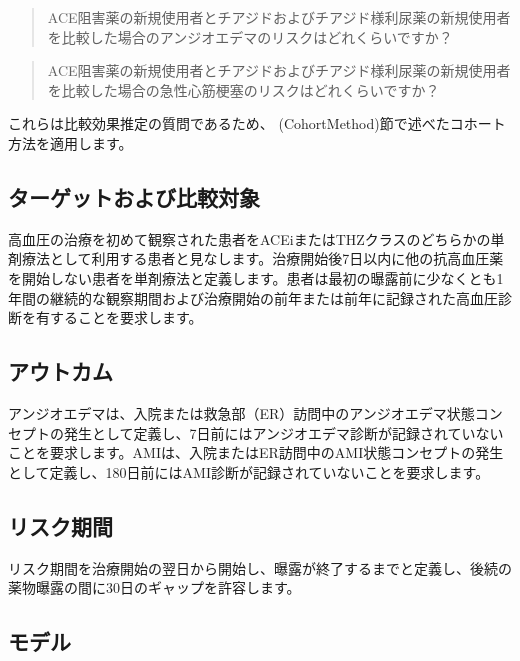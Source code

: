 \documentclass[
  11pt]{book}
\theoremstyle{definition}
\theoremstyle{definition}
\theoremstyle{definition}
\theoremstyle{definition}
\theoremstyle{remark}
\begin{document}
\begin{quote}
ACE阻害薬の新規使用者とチアジドおよびチアジド様利尿薬の新規使用者を比較した場合のアンジオエデマのリスクはどれくらいですか？
\end{quote}

\begin{quote}
ACE阻害薬の新規使用者とチアジドおよびチアジド様利尿薬の新規使用者を比較した場合の急性心筋梗塞のリスクはどれくらいですか？
\end{quote}

これらは比較効果推定の質問であるため、\citet{ref} (CohortMethod)節で述べたコホート方法を適用します。

\subsection{ターゲットおよび比較対象}\label{ux30bfux30fcux30b2ux30c3ux30c8ux304aux3088ux3073ux6bd4ux8f03ux5bfeux8c61}

高血圧の治療を初めて観察された患者をACEiまたはTHZクラスのどちらかの単剤療法として利用する患者と見なします。治療開始後7日以内に他の抗高血圧薬を開始しない患者を単剤療法と定義します。患者は最初の曝露前に少なくとも1年間の継続的な観察期間および治療開始の前年または前年に記録された高血圧診断を有することを要求します。

\subsection{アウトカム}\label{ux30a2ux30a6ux30c8ux30abux30e0}

アンジオエデマは、入院または救急部（ER）訪問中のアンジオエデマ状態コンセプトの発生として定義し、7日前にはアンジオエデマ診断が記録されていないことを要求します。AMIは、入院またはER訪問中のAMI状態コンセプトの発生として定義し、180日前にはAMI診断が記録されていないことを要求します。

\subsection{リスク期間}\label{ux30eaux30b9ux30afux671fux9593-1}

リスク期間を治療開始の翌日から開始し、曝露が終了するまでと定義し、後続の薬物曝露の間に30日のギャップを許容します。

\subsection{モデル}\label{ux30e2ux30c7ux30eb}
\end{document}
